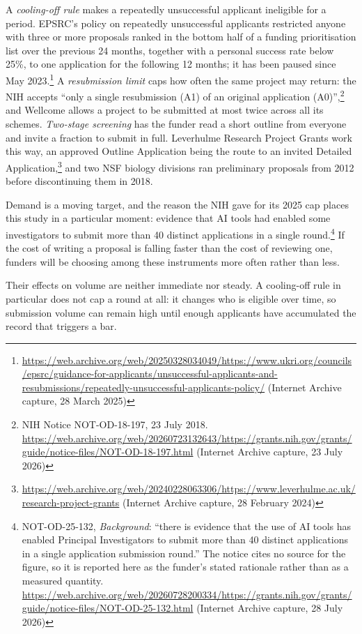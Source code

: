 \documentclass[11pt,a4paper]{article}
\newcommand{\wa}[2]{\url{#1} (Internet Archive capture, #2)}
\begin{document}
A \emph{cooling-off rule} makes a repeatedly unsuccessful applicant ineligible for
a period. EPSRC's policy on repeatedly unsuccessful applicants restricted anyone
with three or more proposals ranked in the bottom half of a funding prioritisation
list over the previous 24 months, together with a personal success rate below
25\%, to one application for the following 12 months; it has been paused since May
2023.\footnote{\wa{https://web.archive.org/web/20250328034049/https://www.ukri.org/councils/epsrc/guidance-for-applicants/unsuccessful-applicants-and-resubmissions/repeatedly-unsuccessful-applicants-policy/}{28 March 2025}}
A \emph{resubmission limit} caps how often the same project may return: the NIH
accepts ``only a single resubmission (A1) of an original application
(A0)'',\footnote{NIH Notice NOT-OD-18-197, 23 July 2018.
\wa{https://web.archive.org/web/20260723132643/https://grants.nih.gov/grants/guide/notice-files/NOT-OD-18-197.html}{23 July 2026}}
and Wellcome allows a project to be submitted at most twice across all its
schemes. \emph{Two-stage screening} has the funder read a short outline from
everyone and invite a fraction to submit in full. Leverhulme Research Project
Grants work this way, an approved Outline Application being the route to an
invited Detailed Application,\footnote{\wa{https://web.archive.org/web/20240228063306/https://www.leverhulme.ac.uk/research-project-grants}{28 February 2024}}
and two NSF biology divisions ran preliminary proposals from 2012 before
discontinuing them in 2018.

Demand is a moving target, and the reason the NIH gave for its 2025 cap places
this study in a particular moment: evidence that AI tools had enabled some
investigators to submit more than 40 distinct applications in a single round.\footnote{NOT-OD-25-132, \emph{Background}: ``there is evidence that the use of AI tools has enabled Principal Investigators to submit more than 40 distinct applications in a single application submission round.'' The notice cites no source for the figure, so it is reported here as the funder's stated rationale rather than as a measured quantity.
\wa{https://web.archive.org/web/20260728200334/https://grants.nih.gov/grants/guide/notice-files/NOT-OD-25-132.html}{28 July 2026}} If
the cost of writing a proposal is falling faster than the cost of reviewing one,
funders will be choosing among these instruments more often rather than less.

Their effects on volume are neither immediate nor steady. A cooling-off rule in
particular does not cap a round at all: it changes who is eligible over time, so
submission volume can remain high until enough applicants have accumulated the
record that triggers a bar.
\end{document}
